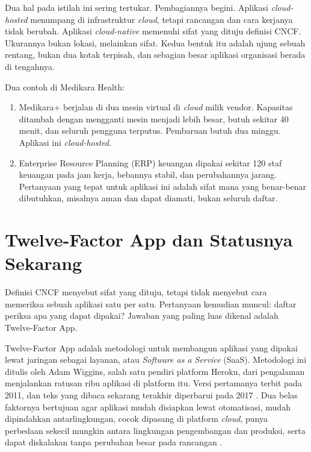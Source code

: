 Dua hal pada istilah ini sering tertukar. Pembagiannya begini. Aplikasi
\textit{cloud-hosted} menumpang di infrastruktur \textit{cloud}, tetapi rancangan dan cara
kerjanya tidak berubah. Aplikasi \textit{cloud-native} memenuhi sifat yang dituju definisi
CNCF. Ukurannya bukan lokasi, melainkan sifat. Kedua bentuk itu adalah ujung sebuah rentang,
bukan dua kotak terpisah, dan sebagian besar aplikasi organisasi berada di tengahnya.

Dua contoh di Medikara Health:
\begin{enumerate}
  \item Medikara+ berjalan di dua mesin virtual di \textit{cloud} milik vendor. Kapasitas
        ditambah dengan mengganti mesin menjadi lebih besar, butuh sekitar 40 menit, dan
        seluruh pengguna terputus. Pembaruan butuh dua minggu. Aplikasi ini
        \textit{cloud-hosted}.
  \item Enterprise Resource Planning (ERP) keuangan dipakai sekitar 120 staf keuangan pada
        jam kerja, bebannya stabil, dan perubahannya jarang. Pertanyaan yang tepat untuk
        aplikasi ini adalah sifat mana yang benar-benar dibutuhkan, misalnya aman dan dapat
        diamati, bukan seluruh daftar.
\end{enumerate}

\section{Twelve-Factor App dan Statusnya Sekarang}
\label{sec:ch05-twelve-factor}

Definisi CNCF menyebut sifat yang dituju, tetapi tidak menyebut cara memeriksa sebuah
aplikasi satu per satu. Pertanyaan kemudian muncul: daftar periksa apa yang dapat dipakai?
Jawaban yang paling luas dikenal adalah Twelve-Factor App.

Twelve-Factor App adalah metodologi untuk membangun aplikasi yang dipakai lewat jaringan
sebagai layanan, atau \textit{Software as a Service} (SaaS). Metodologi ini ditulis oleh
Adam Wiggins, salah satu pendiri platform Heroku, dari pengalaman menjalankan ratusan ribu
aplikasi di platform itu. Versi pertamanya terbit pada 2011, dan teks yang dibaca sekarang
terakhir diperbarui pada 2017 \cite{twelvefactor}. Dua belas faktornya bertujuan agar
aplikasi mudah disiapkan lewat otomatisasi, mudah dipindahkan antarlingkungan, cocok
dipasang di platform \textit{cloud}, punya perbedaan sekecil mungkin antara lingkungan
pengembangan dan produksi, serta dapat diskalakan tanpa perubahan besar pada rancangan
\cite{twelvefactor}.

